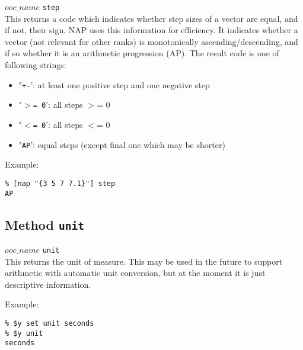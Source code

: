   


  $ooc\_name$ 
  \texttt{step}
  \\
  

This returns a code which indicates whether step sizes of a vector
  are equal, and if not, their sign. NAP uses this information for
  efficiency. It indicates whether a vector (not relevant for other
  ranks) is monotonically ascending/descending, and if so whether it is
  an arithmetic progression (AP). The result code is one of following
  strings:
  \begin{itemize}
    \item "\texttt{+-}': at least one positive step and one negative
    step
    \item "\texttt{$>$= 0}': all steps $>$= 0
    \item "\texttt{$<$= 0}': all steps $<$= 0
    \item "\texttt{AP}': equal steps (except final one which may be
    shorter)
  \end{itemize}
  

Example:
  \begin{verbatim}
% [nap "{3 5 7 7.1}"] step
AP
\end{verbatim}

  \subsection{
    \label{unit}Method \texttt{unit}
  }

  


  $ooc\_name$ 
  \texttt{unit}
  \\
  

This returns the unit of measure. This may be used in the future
  to support arithmetic with automatic unit conversion, but at the
  moment it is just descriptive information.
  

Example:
  \begin{verbatim}
% $y set unit seconds
% $y unit
seconds
\end{verbatim}

